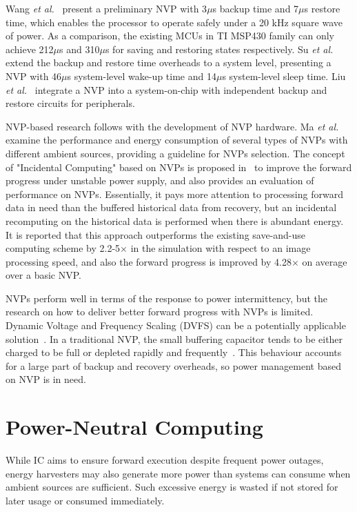 Wang \textit{et al.}~\cite{wang20123us} present a preliminary NVP with 3$\mu$s backup time and 7$\mu$s restore time, which enables the processor to operate safely under a 20 kHz square wave of power. As a comparison, the existing MCUs in TI MSP430 family can only achieve 212$\mu$s and 310$\mu$s for saving and restoring states respectively. Su \textit{et al.}~\cite{su2017ferroelectric} extend the backup and restore time overheads to a system level, presenting a NVP with 46$\mu$s system-level wake-up time and 14$\mu$s system-level sleep time. Liu \textit{et al.}~\cite{liu2019130} integrate a NVP into a system-on-chip with independent backup and restore circuits for peripherals. 

NVP-based research follows with the development of NVP hardware. Ma \textit{et al.}~\cite{ma2015architecture} examine the performance and energy consumption of several types of NVPs with different ambient sources, providing a guideline for NVPs selection. The concept of "Incidental Computing" based on NVPs is proposed in~\cite{ma2017incidental} to improve the forward progress under unstable power supply, and also provides an evaluation of performance on NVPs. Essentially, it pays more attention to processing forward data in need than the buffered historical data from recovery, but an incidental recomputing on the historical data is performed when there is abundant energy. It is reported that this approach outperforms the existing save-and-use computing scheme by 2.2-5$\times$ in the simulation with respect to an image processing speed, and also the forward progress is improved by 4.28$\times$ on average over a basic NVP.

NVPs perform well in terms of the response to power intermittency, but the research on how to deliver better forward progress with NVPs is limited. Dynamic Voltage and Frequency Scaling (DVFS) can be a potentially applicable solution~\cite{ma2016nonvolatile}. In a traditional NVP, the small buffering capacitor tends to be either charged to be full or depleted rapidly and frequently~\cite{su2017nonvolatile}. This behaviour accounts for a large part of backup and recovery overheads, so power management based on NVP is in need.

\section{Power-Neutral Computing} \label{Section:PN}

While IC aims to ensure forward execution despite frequent power outages, energy harvesters may also generate more power than systems can consume when ambient sources are sufficient. Such excessive energy is wasted if not stored for later usage or consumed immediately. 

